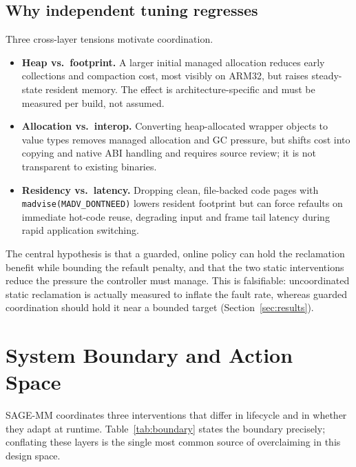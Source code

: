 \documentclass[acmsmall,screen]{acmart}
\begin{document}
\subsection{Why independent tuning regresses}
Three cross-layer tensions motivate coordination.
\begin{itemize}
  \item \textbf{Heap vs.\ footprint.} A larger initial managed allocation
  reduces early collections and compaction cost, most visibly on ARM32,
  but raises steady-state resident memory. The effect is
  architecture-specific and must be measured per build, not assumed.
  \item \textbf{Allocation vs.\ interop.} Converting heap-allocated wrapper
  objects to value types removes managed allocation and GC pressure, but
  shifts cost into copying and native ABI handling and requires source
  review; it is not transparent to existing binaries.
  \item \textbf{Residency vs.\ latency.} Dropping clean, file-backed code
  pages with \texttt{madvise(MADV\_DONTNEED)} lowers resident footprint but
  can force refaults on immediate hot-code reuse, degrading input and frame
  tail latency during rapid application switching.
\end{itemize}
The central hypothesis is that a guarded, online policy can hold the
reclamation benefit while bounding the refault penalty, and that the two
static interventions reduce the pressure the controller must manage. This
is falsifiable: uncoordinated static reclamation is actually measured to inflate the
fault rate, whereas guarded coordination should hold it near a bounded
target (Section~\ref{sec:results}).

\section{System Boundary and Action Space}
\label{sec:boundary}

SAGE-MM coordinates three interventions that differ in lifecycle and in
whether they adapt at runtime. Table~\ref{tab:boundary} states the boundary
precisely; conflating these layers is the single most common source of
overclaiming in this design space.
\end{document}
